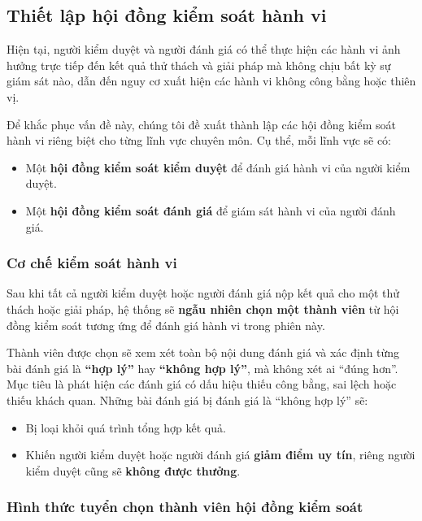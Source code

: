 \subsection{Thiết lập hội đồng kiểm soát hành vi}

Hiện tại, người kiểm duyệt và người đánh giá có thể thực hiện các hành vi ảnh hưởng trực tiếp đến kết quả thử thách và giải pháp mà không chịu bất kỳ sự giám sát nào, dẫn đến nguy cơ xuất hiện các hành vi không công bằng hoặc thiên vị.

Để khắc phục vấn đề này, chúng tôi đề xuất thành lập các hội đồng kiểm soát hành vi riêng biệt cho từng lĩnh vực chuyên môn. Cụ thể, mỗi lĩnh vực sẽ có:
\begin{itemize}
  \item Một \textbf{hội đồng kiểm soát kiểm duyệt} để đánh giá hành vi của người kiểm duyệt.
  \item Một \textbf{hội đồng kiểm soát đánh giá} để giám sát hành vi của người đánh giá.
\end{itemize}

\subsubsection{Cơ chế kiểm soát hành vi}

Sau khi tất cả người kiểm duyệt hoặc người đánh giá nộp kết quả cho một thử thách hoặc giải pháp, hệ thống sẽ \textbf{ngẫu nhiên chọn một thành viên} từ hội đồng kiểm soát tương ứng để đánh giá hành vi trong phiên này.

Thành viên được chọn sẽ xem xét toàn bộ nội dung đánh giá và xác định từng bài đánh giá là \textbf{``hợp lý''} hay \textbf{``không hợp lý''}, mà không xét ai ``đúng hơn''.
Mục tiêu là phát hiện các đánh giá có dấu hiệu thiếu công bằng, sai lệch hoặc thiếu khách quan.
Những bài đánh giá bị đánh giá là ``không hợp lý'' sẽ:
\begin{itemize}
  \item Bị loại khỏi quá trình tổng hợp kết quả.
  \item Khiến người kiểm duyệt hoặc người đánh giá \textbf{giảm điểm uy tín}, riêng người kiểm duyệt cũng sẽ \textbf{không được thưởng}.
\end{itemize}

\subsubsection{Hình thức tuyển chọn thành viên hội đồng kiểm soát}

